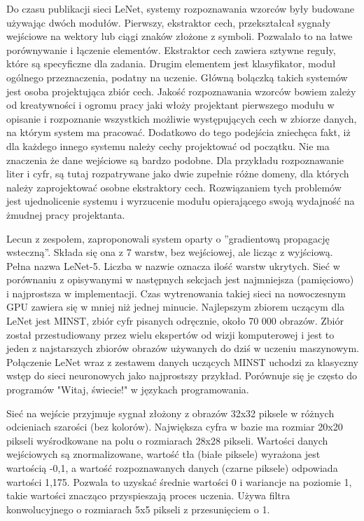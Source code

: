 \documentclass[12pt,a4paper,twoside,titlepage,openright]{book}
\begin{document}
Do czasu publikacji sieci LeNet, systemy rozpoznawania wzorców były budowane używając dwóch modułów. Pierwszy, ekstraktor cech, przekształcał sygnały wejściowe na wektory lub ciągi znaków złożone z symboli. Pozwalało to na łatwe porównywanie i łączenie elementów. Ekstraktor cech zawiera sztywne reguły, które są specyficzne dla zadania. Drugim elementem jest klasyfikator, moduł ogólnego przeznaczenia, podatny na uczenie. Główną bolączką takich systemów jest osoba projektująca zbiór cech. Jakość rozpoznawania wzorców bowiem zależy od kreatywności i ogromu pracy jaki włoży projektant pierwszego modułu w opisanie i rozpoznanie wszystkich możliwie występujących cech w zbiorze danych, na którym system ma pracować. Dodatkowo do tego podejścia zniechęca fakt, iż dla każdego innego systemu należy cechy projektować od początku. Nie ma znaczenia że dane wejściowe są bardzo podobne. Dla przykładu rozpoznawanie liter i cyfr, są tutaj rozpatrywane jako dwie zupełnie różne domeny, dla których należy zaprojektować osobne ekstraktory cech. Rozwiązaniem tych problemów jest ujednolicenie systemu i wyrzucenie modułu opierającego swoją wydajność na żmudnej pracy projektanta.

Lecun z zespołem, zaproponowali system oparty o ''gradientową propagację wsteczną''. Składa się ona z 7 warstw, bez wejściowej, ale licząc z wyjściową. Pełna nazwa LeNet-5. Liczba w nazwie oznacza ilość warstw ukrytych. Sieć w porównaniu z opisywanymi w następnych sekcjach jest najmniejsza (pamięciowo) i najprostsza w implementacji. Czas wytrenowania takiej sieci na nowoczesnym GPU zawiera się w mniej niż jednej minucie. Najlepszym zbiorem uczącym dla LeNet jest MINST, zbiór cyfr pisanych odręcznie, około 70 000 obrazów. Zbiór został przestudiowany przez wielu ekspertów od wizji komputerowej i jest to jeden z najstarszych zbiorów obrazów używanych do dziś w uczeniu maszynowym. Połączenie LeNet wraz z zestawem danych uczących MINST uchodzi za klasyczny wstęp do sieci neuronowych jako najprostszy przykład. Porównuje się je często do programów "Witaj, świecie!" w językach programowania.

Sieć na wejście przyjmuje sygnał złożony z obrazów 32x32 piksele w różnych odcieniach szarości (bez kolorów). Największa cyfra w bazie ma rozmiar 20x20 pikseli wyśrodkowane na polu o rozmiarach 28x28 pikseli. Wartości danych wejściowych są znormalizowane, wartość tła (białe piksele) wyrażona jest wartością -0,1, a wartość rozpoznawanych danych (czarne piksele) odpowiada wartości 1,175. Pozwala to uzyskać średnie wartości 0 i wariancje na poziomie 1, takie wartości znacząco przyspieszają proces uczenia. Używa filtra konwolucyjnego o rozmiarach 5x5 pikseli z przesunięciem o 1.
\end{document}

